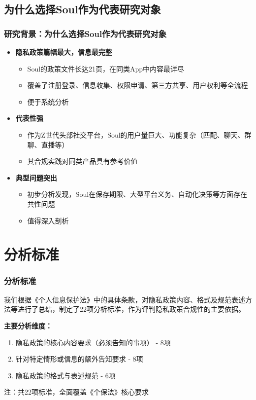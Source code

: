 \documentclass[AutoFakeBold,AutoFakeSlant]{beamer}
\begin{document}
\subsection{为什么选择Soul作为代表研究对象}
\begin{frame}
	\frametitle{研究背景：为什么选择Soul作为代表研究对象}
	\begin{itemize}
		\item \textbf{隐私政策篇幅最大，信息最完整}
		\begin{itemize}
			\item Soul的政策文件长达21页，在同类App中内容最详尽
			\item 覆盖了注册登录、信息收集、权限申请、第三方共享、用户权利等全流程
			\item 便于系统分析
		\end{itemize}
		
		\item \textbf{代表性强}
		\begin{itemize}
			\item 作为Z世代头部社交平台，Soul的用户量巨大、功能复杂（匹配、聊天、群聊、直播等）
			\item 其合规实践对同类产品具有参考价值
		\end{itemize}
		
		\item \textbf{典型问题突出}
		\begin{itemize}
			\item 初步分析发现，Soul在保存期限、大型平台义务、自动化决策等方面存在共性问题
			\item 值得深入剖析
		\end{itemize}
	\end{itemize}
\end{frame}

\section{分析标准}
\begin{frame}
	\frametitle{分析标准}
	我们根据《个人信息保护法》中的具体条款，对隐私政策内容、格式及规范表述方法等进行了总结，制定了22项分析标准，作为评判隐私政策合规性的主要依据。
	
	\vspace{0.5em}
	\textbf{主要分析维度：}
	\begin{enumerate}
		\item 隐私政策的核心内容要求（必须告知的事项） - 8项
		\item 针对特定情形或信息的额外告知要求 - 8项
		\item 隐私政策的格式与表述规范 - 6项
	\end{enumerate}
	
	\vspace{0.5em}
	\footnotesize
	注：共22项标准，全面覆盖《个保法》核心要求
\end{frame}
\end{document}

